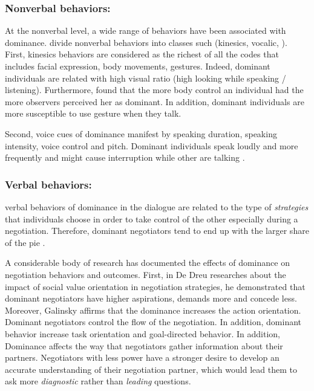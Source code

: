 \documentclass{llncs}
\begin{document}
					\subsubsection{Nonverbal behaviors:}
					At the nonverbal level, a wide range of behaviors have been associated with dominance. \cite{burgoonnonverbal} divide nonverbal behaviors into classes such (kinesics, vocalic, ). First, kinesics behaviors are considered as the richest of all the codes that includes facial expression, body movements, gestures. Indeed, dominant individuals are related with high visual ratio (high looking while speaking / listening).  Furthermore, \cite{burgoonnonverbal} found that the more body control an individual had the more observers perceived her as dominant. In addition, dominant individuals are more susceptible to use gesture when they talk.  
					\par  Second, voice cues of dominance manifest by speaking duration, speaking intensity, voice control and pitch. Dominant individuals speak loudly and more frequently and might cause interruption while other are talking \cite{dunbar2005perceptions}.
					
					\subsubsection{Verbal behaviors:}
					verbal behaviors of dominance in the dialogue are related to the type of \textit{strategies} that individuals choose in order to take control of the other especially during a negotiation. Therefore, dominant negotiators tend to end up with the larger share of the pie \cite{giebels2000interdependence}. 
					\par A considerable body of research has documented the effects of dominance on negotiation behaviors and outcomes. First, in De Dreu researches about the impact of social value orientation in negotiation strategies, he demonstrated that \cite{de1995impact} dominant negotiators have higher aspirations, demands more and concede less. 
					Moreover, Galinsky \cite{galinsky2003power} affirms that the dominance increases the action orientation. Dominant negotiators control the flow of the negotiation. In addition, dominant behavior increase task orientation and goal-directed behavior. In addition, Dominance affects the way that negotiators gather information about their partners. Negotiators with less power have a stronger desire to develop an accurate understanding of their negotiation partner, which would lead them to ask more \emph{diagnostic} rather than \emph{leading} questions.
					 
\end{document}

